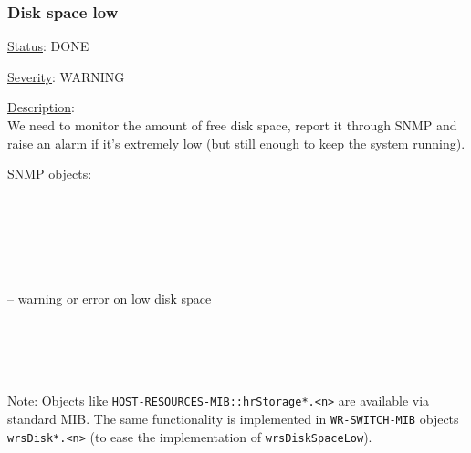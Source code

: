 \subsubsection{\bf Disk space low}
		\label{fail:other:no_disk}
		\begin{pck_descr}
			\item [] \underline{Status}: DONE
			\item [] \underline{Severity}: WARNING
			\item [] \underline{Description}:\\
				We need to monitor the amount of free disk space, report it through SNMP
				and raise an alarm if it's extremely low (but still enough to keep the
				system running).
			\item [] \underline{SNMP objects}:\\
        {\footnotesize
				\\
				\\
				\\
				\\
				\\
				\\
				 -- warning or error on low disk space\\
				\\
				\\
				\\
				\\
         }
			\item [] \underline{Note}:
				Objects like \texttt{HOST-RESOURCES-MIB::hrStorage*.<n>} are available
				via standard MIB. The same functionality is implemented in
				\texttt{WR-SWITCH-MIB} objects \texttt{wrsDisk*.<n>} (to ease the
				implementation of \texttt{wrsDiskSpaceLow}).
		\end{pck_descr}

